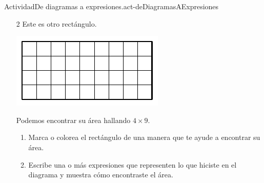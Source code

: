 \documentclass[14pt]{extarticle}
\begin{document}
\begin{activity}{Actividad}{De diagramas a expresiones.}{act-deDiagramasAExpresiones}%
%
\begin{enumerate}
\item[2]{}Este es otro rectángulo.%
\begin{image}{0}{1}{0}{}%
\includegraphics[max width=\linewidth, center]{external/svg-source/tikz-file-153048.pdf}
\end{image}%
Podemos encontrar su área hallando \(4 \times 9\).%
%
\begin{enumerate}
\item{}Marca o colorea el rectángulo de una manera que te ayude a encontrar su área.%
\item{}Escribe una o más expresiones que representen lo que hiciste en el diagrama y muestra cómo encontraste el área.%
\end{enumerate}
\end{enumerate}
\end{activity}
\end{document}
